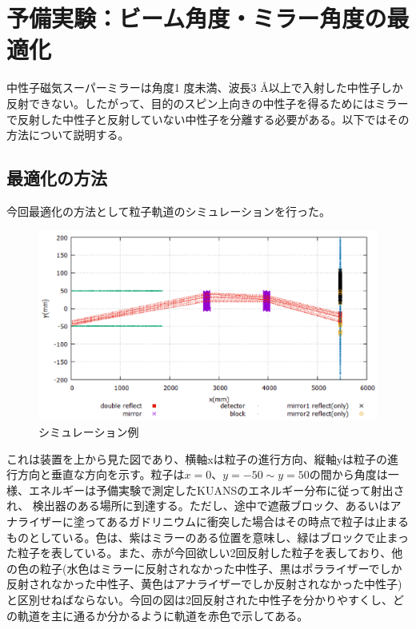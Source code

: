 \section{予備実験：ビーム角度・ミラー角度の最適化}

中性子磁気スーパーミラーは角度1 度未満、波長3  Å以上で入射した中性子しか反射できない。したがって、目的のスピン上向きの中性子を得るためにはミラーで反射した中性子と反射していない中性子を分離する必要がある。以下ではその方法について説明する。

\subsection{最適化の方法}

今回最適化の方法として粒子軌道のシミュレーションを行った。

\begin{figure}[h]
\centering
\includegraphics[keepaspectratio,scale=0.4]{angle/simulation.png}
\caption{シミュレーション例}
\end{figure}

これは装置を上から見た図であり、横軸xは粒子の進行方向、縦軸yは粒子の進行方向と垂直な方向を示す。粒子は$x=0$、$y=-50 \sim y=50$の間から角度は一様、エネルギーは予備実験で測定したKUANSのエネルギー分布に従って射出され、 検出器のある場所に到達する。ただし、途中で遮蔽ブロック、あるいはアナライザーに塗ってあるガドリニウムに衝突した場合はその時点で粒子は止まるものとしている。色は、紫はミラーのある位置を意味し、緑はブロックで止まった粒子を表している。また、赤が今回欲しい2回反射した粒子を表しており、他の色の粒子(水色はミラーに反射されなかった中性子、黒はポラライザーでしか反射されなかった中性子、黄色はアナライザーでしか反射されなかった中性子)と区別せねばならない。今回の図は2回反射された中性子を分かりやすくし、どの軌道を主に通るか分かるように軌道を赤色で示してある。

